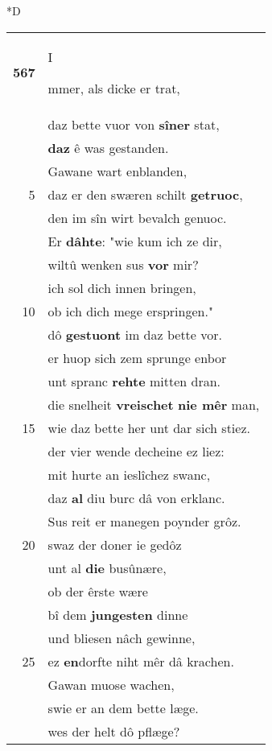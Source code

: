 \documentclass[8pt,a4paper,notitlepage]{article}
\begin{document}
\begin{table}[ht]
\begin{minipage}[t]{0.5\linewidth}
\small
\begin{center}*D
\end{center}
\begin{tabular}{rl}
\textbf{567} & \begin{large}I\end{large}mmer, als dicke er trat,\\ 
 & daz bette vuor von \textbf{sîner} stat,\\ 
 & \textbf{daz} ê was gestanden.\\ 
 & Gawane wart enblanden,\\ 
5 & daz er den swæren schilt \textbf{getruoc},\\ 
 & den im sîn wirt bevalch genuoc.\\ 
 & Er \textbf{dâhte}: "wie kum ich ze dir,\\ 
 & wiltû wenken sus \textbf{vor} mir?\\ 
 & ich sol dich innen bringen,\\ 
10 & ob ich dich mege erspringen."\\ 
 & dô \textbf{gestuont} im daz bette vor.\\ 
 & er huop sich zem sprunge enbor\\ 
 & unt spranc \textbf{rehte} mitten dran.\\ 
 & die snelheit \textbf{vreischet} \textbf{nie mêr} man,\\ 
15 & wie daz bette her unt dar sich stiez.\\ 
 & der vier wende decheine ez liez:\\ 
 & mit hurte an ieslîchez swanc,\\ 
 & daz \textbf{al} diu burc dâ von erklanc.\\ 
 & Sus reit er manegen poynder grôz.\\ 
20 & swaz der doner ie gedôz\\ 
 & unt al \textbf{die} busûnære,\\ 
 & ob der êrste wære\\ 
 & bî dem \textbf{jungesten} dinne\\ 
 & und bliesen nâch gewinne,\\ 
25 & ez \textbf{en}dorfte niht mêr dâ krachen.\\ 
 & Gawan muose wachen,\\ 
 & swie er an dem bette læge.\\ 
 & wes der helt dô pflæge?\\ 

\end{tabular}
\end{minipage}
\end{table}
\end{document}
